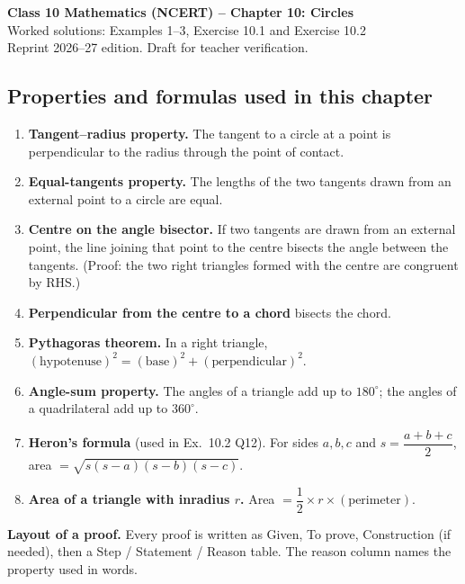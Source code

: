 \documentclass[11pt,a4paper]{article}
\renewcommand{\deg}{^\circ}
\let\oldsubsection\subsection
\renewcommand{\subsection}{\Needspace{12\baselineskip}\oldsubsection}
\begin{document}
\begin{center}
{\Large\bfseries Class 10 Mathematics (NCERT) -- Chapter 10: Circles}\\[4pt]
{\large Worked solutions: Examples 1--3, Exercise 10.1 and Exercise 10.2}\\[2pt]
{\small Reprint 2026--27 edition. Draft for teacher verification.}
\end{center}

\subsection*{Properties and formulas used in this chapter}
\begin{enumerate}[label=(P\arabic*),leftmargin=*]
\item \textbf{Tangent--radius property.} The tangent to a circle at a point is perpendicular to the radius through the point of contact.
\item \textbf{Equal-tangents property.} The lengths of the two tangents drawn from an external point to a circle are equal.
\item \textbf{Centre on the angle bisector.} If two tangents are drawn from an external point, the line joining that point to the centre bisects the angle between the tangents. (Proof: the two right triangles formed with the centre are congruent by RHS.)
\item \textbf{Perpendicular from the centre to a chord} bisects the chord.
\item \textbf{Pythagoras theorem.} In a right triangle, $(\text{hypotenuse})^2=(\text{base})^2+(\text{perpendicular})^2$.
\item \textbf{Angle-sum property.} The angles of a triangle add up to $180\deg$; the angles of a quadrilateral add up to $360\deg$.
\item \textbf{Heron's formula} (used in Ex.\ 10.2 Q12). For sides $a,b,c$ and $s=\dfrac{a+b+c}{2}$, area $=\sqrt{s(s-a)(s-b)(s-c)}$.
\item \textbf{Area of a triangle with inradius $r$.} Area $=\dfrac12\times r\times(\text{perimeter})$.
\end{enumerate}

\textbf{Layout of a proof.} Every proof is written as Given, To prove, Construction (if needed), then a Step / Statement / Reason table. The reason column names the property used in words.




\end{document}
